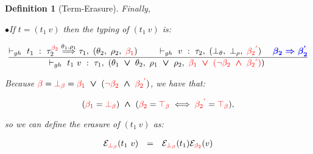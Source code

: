 \documentclass[a4paper,11pt,oneside]{article}
\theoremstyle{plain}
\newtheorem{definition}{Definition}[subsection]
\newcommand{\rouge}[1]{\textcolor{red}{#1}}
\newcommand{\bwedge}{\boldsymbol{~\wedge~}}
\newcommand{\bvee}{\boldsymbol{~\vee~}}
\newcommand{\ghosttyping}[6]{\vdash_{gh}~#1~:~#2,~(#3,~#4,~\rouge{#5})~\textcolor{blue}{\boldsymbol{#6}}}
\newcommand{\bth}{\bot_\theta}
\newcommand{\brh}{\bot_\rho}
\newcommand{\trh}{\top_\rho}
\newcommand{\gb}{\beta}
\newcommand{\gba}[1]{\beta_{#1}}
\newcommand{\gbb}{\bot_\beta}
\newcommand{\gbt}{\top_\beta}
\newcommand{\gbr}{\textcolor{red}{\gb}}
\newcommand{\gbra}[1]{\textcolor{red}{\gba{#1}}}
\newcommand{\gbbr}{\textcolor{red}{\gbb}}
\newcommand{\gbtr}{\textcolor{red}{\gbt}}
\newcommand{\gbran}[1]{\textcolor{red}{\neg\gba{#1}}}
\newcommand{\e}{\mathcal{E}}
\newcommand{\ebot}[1]{\e_{\gbbr}(#1)}
\newcommand{\egbra}[2]{\e_{\gbra{#1}}(#2)}
\begin{document}
\begin{definition}[Term-Erasure]
Finally, 

\noindent$\bullet$\quad If $t = (t_1~v)$ then the typing of $(t_1~v)$ is:
\begin{small}
$$ \dfrac
	{
		\ghosttyping
			{t_1}
			{{\tau_{2}^{\gbra{2}} \stackrel{\theta_1, \rho_1}{\Longrightarrow} \tau_1}}
			{\theta_2}
			{\rho_2}
			{\gbra{1}}
			{} \qquad
		\ghosttyping
		{v}
		{\tau_2}
		{\bth}
		{\brh}
		{\gbra{2}^{\rouge{'}}}
		{\quad \gba{2} \Rightarrow \gba{2}^{'}}}
	{
		\ghosttyping
			{t_1~v}
			{\tau_1}
			{\theta_1 \bvee \theta_2}
			{\rho_1 \bvee \rho_2}
			{\gbra{1} \bvee (\gbran{2} \bwedge \gbra{2}^{\rouge{'}})}
			{}} $$
\end{small}
Because $\gbr =  \gbbr = \gbra{1} \bvee (\gbran{2} \bwedge \gbra{2}^{\rouge{'}})$, we have that: 
\begin{small}
$$(\gbra{1} = \gbbr) \bwedge (\gbra{2} = \gbtr  \iff  \gbra{2}^{\rouge{'}} = \gbtr),$$
\end{small} 
so we can define the erasure of $(t_1~v)$ as:
\begin{small}
\begin{adjustwidth}{-4cm}{3cm}
\begin{displaymath} 
\begin{array}{llll}
\ebot{t_1~v} &=& \ebot{t_1}\egbra{2}{v}

\end{array}
\end{displaymath}
\end{adjustwidth}
\end{small}
\end{definition}
\end{document}
